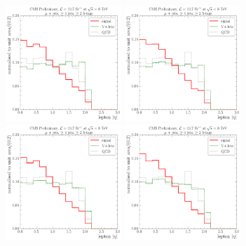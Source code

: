 \begin{figure}[!htbp]
  \centering
    \hspace*{\fill}
    {\includegraphics[width=0.39\textwidth]{measurement/WPT/central/fit_templates/muon_templates_bin_0-40}}\hfill
    {\includegraphics[width=0.39\textwidth]{measurement/WPT/central/fit_templates/muon_templates_bin_40-70}}
    \hspace*{\fill} \\
    \hspace*{\fill}
    {\includegraphics[width=0.39\textwidth]{measurement/WPT/central/fit_templates/muon_templates_bin_70-100}}\hfill
    {\includegraphics[width=0.39\textwidth]{measurement/WPT/central/fit_templates/muon_templates_bin_100-130}}

\end{figure}
